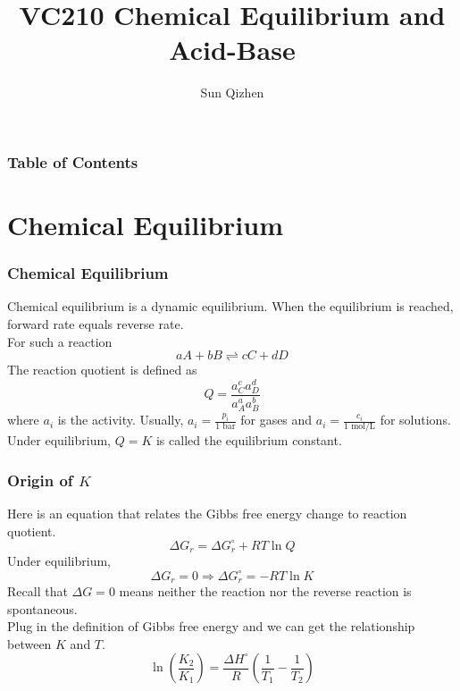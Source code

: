 \documentclass[aspectratio=169]{beamer}
\title[Course number]{VC210 Chemical Equilibrium and Acid-Base}
\author[]{Sun Qizhen}
\institute[UMJI-SJTU]
{
	University of Michigan - Shanghai Jiaotong University
	\\\medskip
	Joint Institute
}
\def\blankline{\\[12pt]}
\begin{document}
\maketitle
\begin{frame}
  \frametitle{Table of Contents}
  \tableofcontents
\end{frame}


\section{Chemical Equilibrium}
\begin{frame}
  \frametitle{Chemical Equilibrium}
  Chemical equilibrium is a dynamic equilibrium. When the equilibrium is reached, forward rate equals reverse rate.
  \blankline
  For such a reaction 
  \begin{equation*}
    aA + bB \rightleftharpoons cC + dD
  \end{equation*}
  The reaction quotient is defined as
  \begin{equation*}
    Q = \frac{a_C^c a_D^d}{a_A^a a_B^b}
  \end{equation*}
  where $a_i$ is the activity. Usually, $a_i = \frac{p_i}{1\text{ bar}}$ for gases and $a_i = \frac{c_i}{1 \text{ mol/L}}$ for solutions. 
  Under equilibrium, $Q = K$ is called the equilibrium constant.
\end{frame}
\begin{frame}
  \frametitle{Origin of $K$}
  Here is an equation that relates the Gibbs free energy change to reaction quotient.
  \begin{equation*}
    \Delta G_r = \Delta G_r^{\circ} + RT \ln Q
  \end{equation*}
  Under equilibrium, 
  \begin{equation*}
    \Delta G_r = 0 \Rightarrow \Delta G_r^{\circ} = -RT \ln K
  \end{equation*}
  Recall that $\Delta G = 0$ means neither the reaction nor the reverse reaction is spontaneous. \\
  Plug in the definition of Gibbs free energy and we can get the relationship between $K$ and $T$.
  \begin{equation*}
    \ln (\frac{K_2}{K_1}) = \frac{\Delta H^{\circ}}{R}\left(\frac{1}{T_1} - \frac{1}{T_2}\right)
  \end{equation*}
\end{frame}
\end{document}
